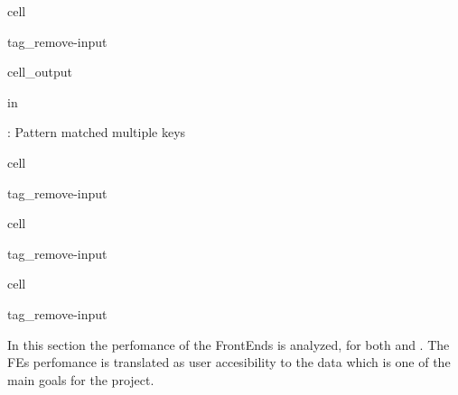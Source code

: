 \documentclass[letterpaper,10pt,english]{jupyterBook}
\begin{document}
\begin{sphinxuseclass}{cell}
\begin{sphinxuseclass}{tag_remove-input}
\begin{sphinxVerbatimOutput}
\begin{sphinxuseclass}{cell_output}
\begin{sphinxVerbatim}[commandchars=\\\{\}]
 in 
      
    
      
   \PYG{p}{[}\PYG{p}{]}
   

: Pattern matched multiple keys
\end{sphinxVerbatim}

\end{sphinxuseclass}\end{sphinxVerbatimOutput}

\end{sphinxuseclass}
\end{sphinxuseclass}
\begin{sphinxuseclass}{cell}
\begin{sphinxuseclass}{tag_remove-input}
\end{sphinxuseclass}
\end{sphinxuseclass}
\begin{sphinxuseclass}{cell}
\begin{sphinxuseclass}{tag_remove-input}
\end{sphinxuseclass}
\end{sphinxuseclass}
\begin{sphinxuseclass}{cell}
\begin{sphinxuseclass}{tag_remove-input}
\end{sphinxuseclass}
\end{sphinxuseclass}
\sphinxAtStartPar
In this section the perfomance of the FrontEnds is analyzed, for both  and . The FEs perfomance is translated as user accesibility to the data which is one of the main goals for the project.
\end{document}
